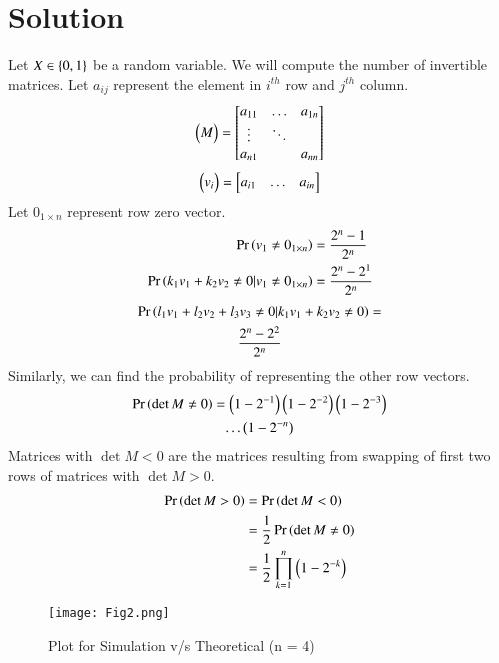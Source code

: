\documentclass[journal,12pt,twocolumn]{IEEEtran}
\begin{document}
\section*{Solution}
Let $X \in \left\{0,1\right\}$ be a random variable. We will compute the number of invertible matrices. Let $a_{ij}$ represent the element in $i^{th}$ row and $j^{th}$ column.
\begin{align}
    \begin{pmatrix}M\end{pmatrix}=
    \begin{bmatrix}
    a_{11} & \dots & a_{1n} \\
    \vdots & \ddots & \\
    a_{n1} &        & a_{nn}
    \end{bmatrix}
\end{align}
\begin{align}
    \begin{pmatrix}v_i\end{pmatrix} =
    \begin{bmatrix}
    a_{i1} & \dots &a_{in}
    \end{bmatrix}
\end{align}
Let $0_{1 \times n}$ represent row zero vector.
\begin{align}
    \Pr\left(v_1 \neq 0_{1 \times n}\right) &= \frac{2^n - 1}{2^n}\\
    \Pr\left(k_1v_1 + k_2v_2 \neq 0 | v_1 \neq 0_{1 \times n}\right) &= \frac{2^n - 2^1}{2^n}
\end{align}
\begin{multline}
    \Pr\left(l_1v_1 + l_2v_2 + l_3v_3 \neq 0 | k_1v_1 + k_2v_2 \neq 0\right) =\\ \frac{2^n - 2^2}{2^n}
\end{multline}
Similarly, we can find the probability of representing the other row vectors.
\begin{multline}
    \Pr\left(\det{M} \neq 0\right) = \left(1 - 2^{-1}\right)\left(1 - 2^{-2}\right)\left(1 - 2^{-3}\right)\\ \dots \left(1 - 2^{-n}\right)
\end{multline}
Matrices with $\det{M} < 0$ are the matrices resulting from swapping of first two rows of matrices with $\det{M} > 0$.
\begin{align}
    \Pr\left(\det{M} > 0\right) &= \Pr\left(\det{M} < 0\right)\\
    &= \frac{1}{2}\Pr\left(\det{M} \neq 0\right)\\
    &= \frac{1}{2}\prod_{k = 1}^{n}\left(1 - 2^{-k}\right)
\end{align}
\begin{figure}[h]
    \centering
    \texttt{[image: Fig2.png]}
    \caption{Plot for Simulation v/s Theoretical (n = 4)}
    \label{fig:plot}
\end{figure}
\end{document}
